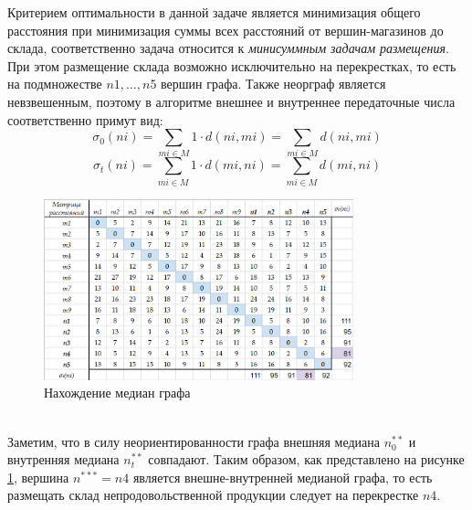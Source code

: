 \documentclass{article}
\begin{document}
\begin{enumerate}
Критерием оптимальности в данной задаче является минимизация
общего расстояния при минимизация суммы всех расстояний от вершин-магазинов до склада, соответственно задача относится к \textit{минисуммным задачам размещения}. 
При этом размещение склада возможно исключительно на перекрестках, то есть на подмножестве $n1, \dots, n5$ вершин графа. Также неорграф является невзвешенным, поэтому в алгоритме внешнее и внутреннее передаточные числа соответственно примут вид:
$$\sigma_0\left(ni\right) = \sum_{mi \in M} 1\cdot d\left(ni,mi\right) =
\sum_{mi \in M} d\left(ni,mi\right)$$
$$\sigma_t\left(ni\right) = \sum_{mi \in M} 1\cdot d\left(mi,ni\right) =
\sum_{mi \in M} d\left(mi,ni\right)$$
\begin{figure}[ht]
    \centering
    \includegraphics[width=0.8\textwidth, center]{attachments/20/01.png}
    \caption{Нахождение медиан графа}
    \label{fig:20_res}
\end{figure}
\\
Заметим, что в силу неориентированности графа внешняя медиана $n_0^{**}$ и внутренняя медиана $n_t^{**}$ совпадают.
Таким образом, как представлено на рисунке \ref{fig:20_res}, вершина $n^{***} = n4$ является внешне-внутренней медианой графа, то есть размещать склад непродовольственной продукции следует на перекрестке $n4$.
\end{enumerate}
\end{document}
